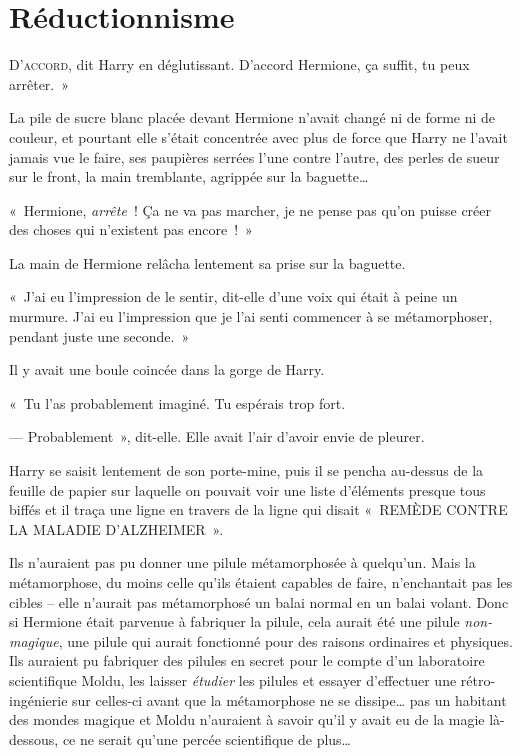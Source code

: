 \chapter{Réductionnisme}

\lettrine[ante=«~]{D}{'accord}, dit Harry en déglutissant. D'accord Hermione, ça suffit, tu peux arrêter.~»

La pile de sucre blanc placée devant Hermione n'avait changé ni de forme ni de couleur, et pourtant elle s'était concentrée avec plus de force que Harry ne l'avait jamais vue le faire, ses paupières serrées l'une contre l'autre, des perles de sueur sur le front, la main tremblante, agrippée sur la baguette…

«~Hermione, \emph{arrête}~! Ça ne va pas marcher, je ne pense pas qu'on puisse créer des choses qui n'existent pas encore~!~»

La main de Hermione relâcha lentement sa prise sur la baguette.

«~J'ai eu l'impression de le sentir, dit-elle d'une voix qui était à peine un murmure. J'ai eu l'impression que je l'ai senti commencer à se métamorphoser, pendant juste une seconde.~»

Il y avait une boule coincée dans la gorge de Harry.

«~Tu l'as probablement imaginé. Tu espérais trop fort.

--- Probablement~», dit-elle. Elle avait l'air d'avoir envie de pleurer.

Harry se saisit lentement de son porte-mine, puis il se pencha au-dessus de la feuille de papier sur laquelle on pouvait voir une liste d'éléments presque tous biffés et il traça une ligne en travers de la ligne qui disait «~REMÈDE CONTRE LA MALADIE D'ALZHEIMER~».

Ils n'auraient pas pu donner une pilule métamorphosée à quelqu'un. Mais la métamorphose, du moins celle qu'ils étaient capables de faire, n'enchantait pas les cibles -- elle n'aurait pas métamorphosé un balai normal en un balai volant. Donc si Hermione était parvenue à fabriquer la pilule, cela aurait été une pilule \emph{non-magique}, une pilule qui aurait fonctionné pour des raisons ordinaires et physiques. Ils auraient pu fabriquer des pilules en secret pour le compte d'un laboratoire scientifique Moldu, les laisser \emph{étudier} les pilules et essayer d'effectuer une rétro-ingénierie sur celles-ci avant que la métamorphose ne se dissipe… pas un habitant des mondes magique et Moldu n'auraient à savoir qu'il y avait eu de la magie là-dessous, ce ne serait qu'une percée scientifique de plus…

